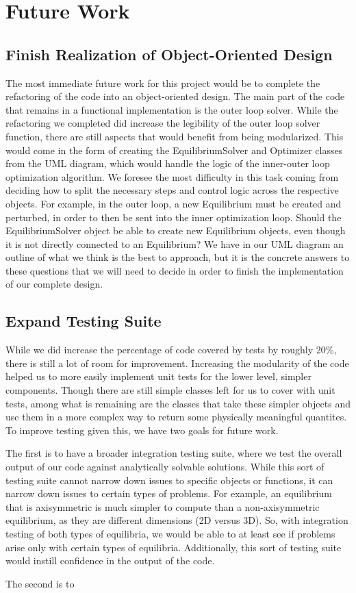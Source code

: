 \documentclass{article}
\begin{document}
\section{Future Work}

\subsection{Finish Realization of Object-Oriented Design}

The most immediate future work for this project would be to complete the refactoring of the code into an object-oriented design.
The main part of the code that remains in a functional implementation is the outer loop solver.
While the refactoring we completed did increase the legibility of the outer loop solver function, there are still aspects that would benefit from being modularized.
This would come in the form of creating the EquilibriumSolver and Optimizer classes from the UML diagram, which would handle the logic of the inner-outer loop optimization algorithm.
We foresee the most difficulty in this task coming from deciding how to split the necessary steps and control logic across the respective objects.
For example, in the outer loop, a new Equilibrium must be created and perturbed, in order to then be sent into the inner optimization loop.
Should the EquilibriumSolver object be able to create new Equilibrium objects, even though it is not directly connected to an Equilibrium?
We have in our UML diagram an outline of what we think is the best to approach, but it is the concrete answers to these questions that we will need to decide in order to finish the implementation of our complete design.

\subsection{Expand Testing Suite}
While we did increase the percentage of code covered by tests by roughly 20\%, there is still a lot of room for improvement.
Increasing the modularity of the code helped us to more easily implement unit tests for the lower level, simpler components.
Though there are still simple classes left for us to cover with unit tests, among what is remaining are the classes that take these simpler objects and use them in a more complex way to return some physically meaningful quantites.
To improve testing given this, we have two goals for future work.

The first is to have a broader integration testing suite, where we test the overall output of our code against analytically solvable solutions.
While this sort of testing suite cannot narrow down issues to specific objects or functions, it can narrow down issues to certain types of problems.
For example, an equilibrium that is axisymmetric is much simpler to compute than a non-axisymmetric equilibrium, as they are different dimensions (2D versus 3D).
So, with integration testing of both types of equilibria, we would be able to at least see if problems arise only with certain types of equilibria.
Additionally, this sort of testing suite would instill confidence in the output of the code.

The second is to


\end{document}
